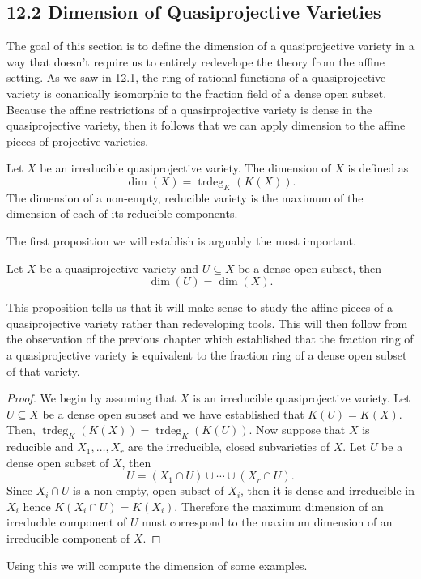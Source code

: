 \documentclass[40pt]{article}
\DeclareMathOperator{\trdeg}{\text{trdeg}}
\theoremstyle{remark}
\begin{document}
		\subsection{12.2 Dimension of Quasiprojective Varieties}
		The goal of this section is to define the dimension of a quasiprojective variety in a way that doesn't require us to entirely redevelope the theory from the affine setting. As we saw in 12.1, the ring of rational functions of a quasiprojective variety is conanically isomorphic to the fraction field of a dense open subset. Because the affine restrictions of a quasirprojective variety is dense in the quasiprojective variety, then it follows that we can apply dimension to the affine pieces of projective varieties. 
		\begin{newdef}
			Let $X$ be an irreducible quasiprojective variety. The dimension of $X$ is defined as 
			\[
			\dim(X) = \trdeg_K(K(X)).
			\]
			The dimension of a non-empty, reducible variety is the maximum of the dimension of each of its reducible components. 
		\end{newdef}
		The first proposition we will establish is arguably the most important. 
		\begin{prop}
			Let $X$ be a quasiprojective variety and $U\subseteq X$ be a dense open subset, then
			\[
			\dim(U) = \dim(X).
			\]
		\end{prop}
		This proposition tells us that it will make sense to study the affine pieces of a quasiprojective variety rather than redeveloping tools. This will then follow from the observation of the previous chapter which established that the fraction ring of a quasiprojective variety is equivalent to the fraction ring of a dense open subset of that variety. 
		\begin{proof}
			We begin by assuming that $X$ is an irreducible quasiprojective variety. Let $U \subseteq X$ be a dense open subset and we have established that $K(U) = K(X)$. Then, $\trdeg_K(K(X)) = \trdeg_K(K(U))$. Now suppose that $X$ is reducible and $X_1,\dots,X_r$ are the irreducible, closed subvarieties of $X$. Let $U$ be a dense open subset of $X$, then 
			\[
			U = (X_1 \cap U) \cup \cdots \cup (X_r \cap U).
			\]
			Since $X_i \cap U$ is a non-empty, open subset of $X_i$, then it is dense and irreducible in $X_i$ hence $K(X_i \cap U) = K(X_i)$. Therefore the maximum dimension of an irreducble component of $U$ must correspond to the maximum dimension of an irreducible component of $X$. 
		\end{proof}
		Using this we will compute the dimension of some examples. 
\end{document}
